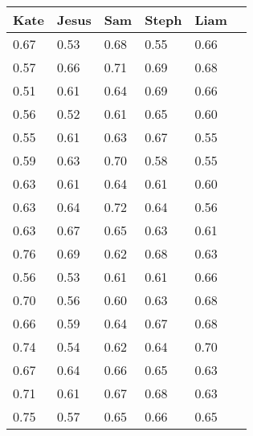 \documentclass[11pt, letterpaper, includehead]{article}
\begin{document}
\begin{center}
  \begin{tabular}{|   m{2cm}  |  m{2cm}  |  m{2cm}  |  m{2cm}  |  m{2cm}  |  m{2cm}  | }
    \hline
    \textbf{Kate} & \textbf{Jesus} & \textbf{Sam} & \textbf{Steph} & \textbf{Liam} \\
    \hline\hline
    0.67          & 0.53           & 0.68         & 0.55           & 0.66          \\
    \hline
    0.57          & 0.66           & 0.71         & 0.69           & 0.68          \\
    \hline
    0.51          & 0.61           & 0.64         & 0.69           & 0.66          \\
    \hline
    0.56          & 0.52           & 0.61         & 0.65           & 0.60          \\
    \hline
    0.55          & 0.61           & 0.63         & 0.67           & 0.55          \\
    \hline
    0.59          & 0.63           & 0.70         & 0.58           & 0.55          \\
    \hline
    0.63          & 0.61           & 0.64         & 0.61           & 0.60          \\
    \hline
    0.63          & 0.64           & 0.72         & 0.64           & 0.56          \\
    \hline
    0.63          & 0.67           & 0.65         & 0.63           & 0.61          \\
    \hline
    0.76          & 0.69           & 0.62         & 0.68           & 0.63          \\
    \hline
    0.56          & 0.53           & 0.61         & 0.61           & 0.66          \\
    \hline
    0.70          & 0.56           & 0.60         & 0.63           & 0.68          \\
    \hline
    0.66          & 0.59           & 0.64         & 0.67           & 0.68          \\
    \hline
    0.74          & 0.54           & 0.62         & 0.64           & 0.70          \\
    \hline
    0.67          & 0.64           & 0.66         & 0.65           & 0.63          \\
    \hline
    0.71          & 0.61           & 0.67         & 0.68           & 0.63          \\
    \hline
    0.75          & 0.57           & 0.65         & 0.66           & 0.65          \\

\end{tabular}
\end{center}
\end{document}
